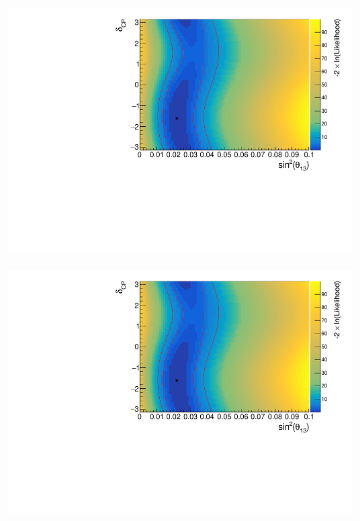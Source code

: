 \begin{figure}[h]
  \begin{subfigure}[t]{0.5\textwidth}
    \includegraphics[width=\textwidth, trim={0mm 0mm 0mm 0mm}, clip,page=1]{Figures/OA/AppearanceScans.pdf}
  \end{subfigure}%
  \begin{subfigure}[t]{0.5\textwidth}
    \includegraphics[width=\textwidth, trim={0mm 0mm 0mm 0mm}, clip,page=2]{Figures/OA/AppearanceScans.pdf}
  \end{subfigure}
  \begin{subfigure}[t]{1.0\textwidth}

\end{subfigure}
\end{figure}

